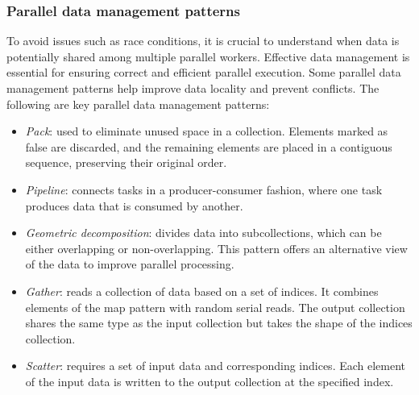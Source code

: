 \subsubsection{Parallel data management patterns}
To avoid issues such as race conditions, it is crucial to understand when data is potentially shared among multiple parallel workers. 
Effective data management is essential for ensuring correct and efficient parallel execution. Some parallel data management patterns help improve data locality and prevent conflicts.
The following are key parallel data management patterns:
\begin{itemize}
    \item \textit{Pack}: used to eliminate unused space in a collection. 
        Elements marked as false are discarded, and the remaining elements are placed in a contiguous sequence, preserving their original order. 
    \item \textit{Pipeline}: connects tasks in a producer-consumer fashion, where one task produces data that is consumed by another. 
    \item \textit{Geometric decomposition}: divides data into subcollections, which can be either overlapping or non-overlapping. 
        This pattern offers an alternative view of the data to improve parallel processing.
    \item \textit{Gather}: reads a collection of data based on a set of indices. 
        It combines elements of the map pattern with random serial reads. 
        The output collection shares the same type as the input collection but takes the shape of the indices collection.
    \item \textit{Scatter}: requires a set of input data and corresponding indices. 
        Each element of the input data is written to the output collection at the specified index. 
\end{itemize}